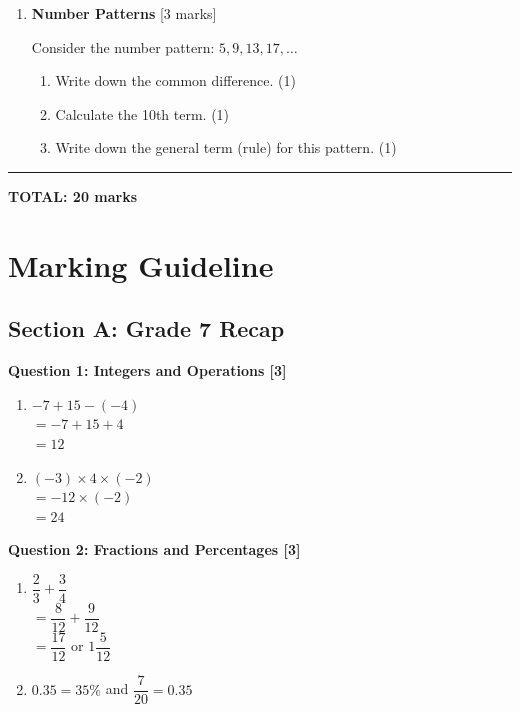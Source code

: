 \documentclass[12pt,a4paper]{article}
\begin{document}
\begin{enumerate}
    \item \textbf{Number Patterns} \hfill [3 marks]
    
    Consider the number pattern: $5, 9, 13, 17, \ldots$
    
    \begin{enumerate}[label=(\alph*)]
        \item Write down the common difference. \hfill (1)
        \vspace{1cm}
        
        \item Calculate the 10th term. \hfill (1)
        \vspace{2cm}
        
        \item Write down the general term (rule) for this pattern. \hfill (1)
    \end{enumerate}
\end{enumerate}

\vspace{1cm}
\hrule
\vspace{0.3cm}
\noindent\textbf{TOTAL: 20 marks}

\newpage
\section*{Marking Guideline}

\subsection*{Section A: Grade 7 Recap}

\textbf{Question 1: Integers and Operations [3]}
\begin{enumerate}[label=(\alph*)]
    \item $-7 + 15 - (-4)$ \\
    $= -7 + 15 + 4$ \checkmark \\
    $= 12$ \checkmark\checkmark
    \vspace{0.3cm}
    
    \item $(-3) \times 4 \times (-2)$ \\
    $= -12 \times (-2)$ \checkmark \\
    $= 24$ \checkmark
\end{enumerate}

\textbf{Question 2: Fractions and Percentages [3]}
\begin{enumerate}[label=(\alph*)]
    \item $\dfrac{2}{3} + \dfrac{3}{4}$ \\
    $= \dfrac{8}{12} + \dfrac{9}{12}$ \checkmark \\
    $= \dfrac{17}{12}$ or $1\dfrac{5}{12}$ \checkmark\checkmark
    \vspace{0.3cm}
    
    \item $0.35 = 35\%$ \checkmark \quad and \quad $\dfrac{7}{20} = 0.35$ \checkmark
\end{enumerate}
\end{document}
